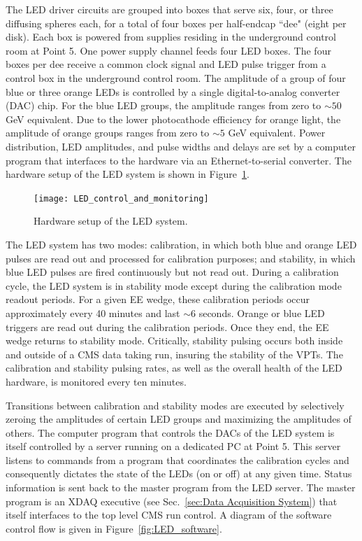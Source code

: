 \documentclass[dissertation.tex]{subfiles}
\begin{document}
The LED driver circuits are grouped into boxes that serve six, four, or three diffusing spheres each, for a total of four boxes per half-endcap ``dee" (eight per disk).  Each box is powered from supplies residing in the underground control room at Point 5.  One power supply channel feeds four LED boxes.  The four boxes per dee receive a common clock signal and LED pulse trigger from a control box in the underground control room.  The amplitude of a group of four blue or three orange LEDs is controlled by a single digital-to-analog converter (DAC) chip.  For the blue LED groups, the amplitude ranges from zero to $\sim50$ GeV equivalent.  Due to the lower photocathode efficiency for orange light, the amplitude of orange groups ranges from zero to $\sim5$ GeV equivalent.  Power distribution, LED amplitudes, and pulse widths and delays are set by a computer program that interfaces to the hardware via an Ethernet-to-serial converter.  The hardware setup of the LED system is shown in Figure~\ref{fig:LED_hardware}.

\begin{figure}
	\centering
	\texttt{[image: LED\_control\_and\_monitoring]}
	\caption{Hardware setup of the LED system.}
	\label{fig:LED_hardware}
\end{figure}

The LED system has two modes: calibration, in which both blue and orange LED pulses are read out and processed for calibration purposes; and stability, in which blue LED pulses are fired continuously but not read out.  During a calibration cycle, the LED system is in stability mode except during the calibration mode readout periods.  For a given EE wedge, these calibration periods occur approximately every 40 minutes and last $\sim6$ seconds.  Orange or blue LED triggers are read out during the calibration periods.  Once they end, the EE wedge returns to stability mode.  Critically, stability pulsing occurs both inside and outside of a CMS data taking run, insuring the stability of the VPTs.  The calibration and stability pulsing rates, as well as the overall health of the LED hardware, is monitored every ten minutes.

Transitions between calibration and stability modes are executed by selectively zeroing the amplitudes of certain LED groups and maximizing the amplitudes of others.  The computer program that controls the DACs of the LED system is itself controlled by a server running on a dedicated PC at Point 5.  This server listens to commands from a program that coordinates the calibration cycles and consequently dictates the state of the LEDs (on or off) at any given time.  Status information is sent back to the master program from the LED server.  The master program is an XDAQ executive (see Sec.~\ref{sec:Data Acquisition System}) that itself interfaces to the top level CMS run control.  A diagram of the software control flow is given in Figure~\ref{fig:LED_software}.
\end{document}
